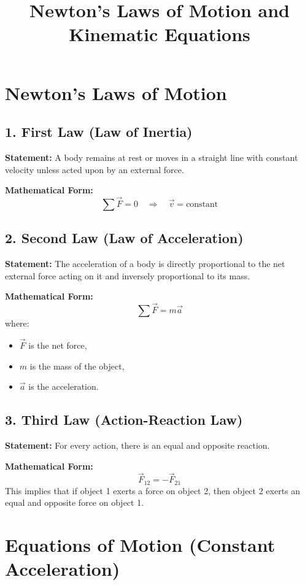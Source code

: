 \documentclass[12pt]{article}
\title{Newton's Laws of Motion and Kinematic Equations}
\date{}
\begin{document}
\maketitle

\section*{Newton's Laws of Motion}

\subsection*{1. First Law (Law of Inertia)}
\textbf{Statement:} A body remains at rest or moves in a straight line with constant velocity unless acted upon by an external force.

\textbf{Mathematical Form:}
\[
\sum \vec{F} = 0 \quad \Rightarrow \quad \vec{v} = \text{constant}
\]

\subsection*{2. Second Law (Law of Acceleration)}
\textbf{Statement:} The acceleration of a body is directly proportional to the net external force acting on it and inversely proportional to its mass.

\textbf{Mathematical Form:}
\[
\sum \vec{F} = m \vec{a}
\]
where:
\begin{itemize}
    \item \( \vec{F} \) is the net force,
    \item \( m \) is the mass of the object,
    \item \( \vec{a} \) is the acceleration.
\end{itemize}

\subsection*{3. Third Law (Action-Reaction Law)}
\textbf{Statement:} For every action, there is an equal and opposite reaction.

\textbf{Mathematical Form:}
\[
\vec{F}_{12} = -\vec{F}_{21}
\]
This implies that if object 1 exerts a force on object 2, then object 2 exerts an equal and opposite force on object 1.

\section*{Equations of Motion (Constant Acceleration)}
\end{document}
